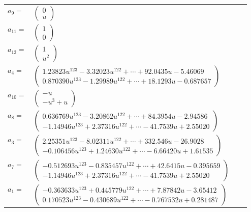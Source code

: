 \documentclass[1p]{elsarticle_modified}
\theoremstyle{definition}
\begin{document}
\begin{tabular}{m{7pt} m{180pt} m{7pt} m{180pt} }
\flushright $a_{9}=$&$\begin{pmatrix}0\\u\end{pmatrix}$ \\
\flushright $a_{11}=$&$\begin{pmatrix}1\\0\end{pmatrix}$ \\
\flushright $a_{12}=$&$\begin{pmatrix}1\\u^2\end{pmatrix}$ \\
\flushright $a_{4}=$&$\begin{pmatrix}1.23823 u^{123}-3.32023 u^{122}+\cdots+92.0435 u-5.46069\\0.870390 u^{123}-1.29989 u^{122}+\cdots+18.1293 u-0.687657\end{pmatrix}$ \\
\flushright $a_{10}=$&$\begin{pmatrix}- u\\- u^3+u\end{pmatrix}$ \\
\flushright $a_{8}=$&$\begin{pmatrix}0.636769 u^{123}-3.20862 u^{122}+\cdots+84.3954 u-2.94586\\-1.14946 u^{123}+2.37316 u^{122}+\cdots-41.7539 u+2.55020\end{pmatrix}$ \\
\flushright $a_{3}=$&$\begin{pmatrix}2.25351 u^{123}-8.02311 u^{122}+\cdots+332.546 u-26.9028\\-0.106456 u^{123}+1.24630 u^{122}+\cdots-6.66420 u+1.61535\end{pmatrix}$ \\
\flushright $a_{7}=$&$\begin{pmatrix}-0.512693 u^{123}-0.835457 u^{122}+\cdots+42.6415 u-0.395659\\-1.14946 u^{123}+2.37316 u^{122}+\cdots-41.7539 u+2.55020\end{pmatrix}$ \\
\flushright $a_{1}=$&$\begin{pmatrix}-0.363633 u^{123}+0.445779 u^{122}+\cdots+7.87842 u-3.65412\\0.170523 u^{123}-0.430689 u^{122}+\cdots-0.767532 u+0.281487\end{pmatrix}$ \\

\end{tabular}
\end{document}
